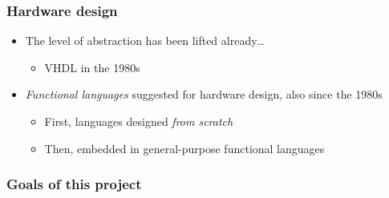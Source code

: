         \begin{frame}
            \frametitle{Hardware design}

            \begin{itemize}
                \item The level of abstraction has been lifted already\ldots
                    \begin{itemize}
                        \item VHDL in the 1980s
                    \end{itemize}
                \item \emph{Functional languages} suggested for hardware design, also since the 1980s
                    \begin{itemize}
                        \item First, languages designed \emph{from scratch}
                        \item Then, embedded in general-purpose functional languages
                    \end{itemize}
            \end{itemize}
        \end{frame}

        \begin{frame}
            \frametitle{Goals of this project}
        \end{frame}


